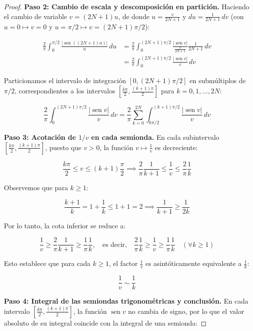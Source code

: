\begin{proof}
\medskip
\textbf{Paso 2: Cambio de escala y descomposición en partición.}
Haciendo el cambio de variable $v = (2N + 1)u$, de donde $u = \frac{v}{2N+1}$ y $du = \frac{1}{2N + 1} \, dv$ (con $u = 0 \mapsto v = 0$ y $u = \pi/2 \mapsto v = (2N+1)\pi/2$):


$$\begin{aligned}\frac{2}{\pi} \int_0^{\pi/2} \frac{\vert{}\operatorname{sen}((2N + 1)u)\vert{}}{u} \, du &= \frac{2}{\pi} \int_0^{(2N+1)\pi/2} \frac{\vert{}\operatorname{sen} v\vert{}}{\frac{v}{2N + 1}} \frac{1}{2N + 1} \, dv \\ &= \frac{2}{\pi} \int_0^{(2N+1)\pi/2} \frac{\vert{}\operatorname{sen} v\vert{}}{v} \, dv\end{aligned}$$

Particionamos el intervalo de integración $[0, (2N+1)\pi/2]$ en submúltiplos de $\pi/2$, correspondientes a los intervalos $\left[ \frac{k\pi}{2}, \frac{(k+1)\pi}{2} \right]$ para $k = 0, 1, \dots, 2N$:


$$\frac{2}{\pi} \int_0^{(2N+1)\pi/2} \frac{\vert{}\operatorname{sen} v\vert{}}{v} \, dv = \frac{2}{\pi} \sum_{k=0}^{2N} \int_{k\pi/2}^{(k+1)\pi/2} \frac{\vert{}\operatorname{sen} v\vert{}}{v} \, dv$$

\medskip
\textbf{Paso 3: Acotación de $1/v$ en cada semionda.}
En cada subintervalo $\left[ \frac{k\pi}{2}, \frac{(k+1)\pi}{2} \right]$, puesto que $v > 0$, la función $v \mapsto \frac{1}{v}$ es decreciente:


$$\frac{k\pi}{2} \le v \le (k+1)\frac{\pi}{2} \implies \frac{2}{\pi} \frac{1}{k+1} \le \frac{1}{v} \le \frac{2}{\pi} \frac{1}{k}$$

Observemos que para $k \ge 1$:


$$\frac{k+1}{k} = 1 + \frac{1}{k} \le 1 + 1 = 2 \implies \frac{1}{k+1} \ge \frac{1}{2k}$$

Por lo tanto, la cota inferior se reduce a:


$$\frac{1}{v} \ge \frac{2}{\pi} \frac{1}{k+1} \ge \frac{1}{\pi} \frac{1}{k}, \quad \text{es decir,} \quad \frac{2}{\pi} \frac{1}{k} \ge \frac{1}{v} \ge \frac{1}{\pi} \frac{1}{k} \quad (\forall k \ge 1)$$

Esto establece que para cada $k \ge 1$, el factor $\frac{1}{v}$ es asintóticamente equivalente a $\frac{1}{k}$:


$$\frac{1}{v} \sim \frac{1}{k}$$

\medskip
\textbf{Paso 4: Integral de las semiondas trigonométricas y conclusión.}
En cada intervalo $\left[ \frac{k\pi}{2}, \frac{(k+1)\pi}{2} \right]$, la función $\operatorname{sen} v$ no cambia de signo, por lo que el valor absoluto de su integral coincide con la integral de una semionda:



\end{proof}
